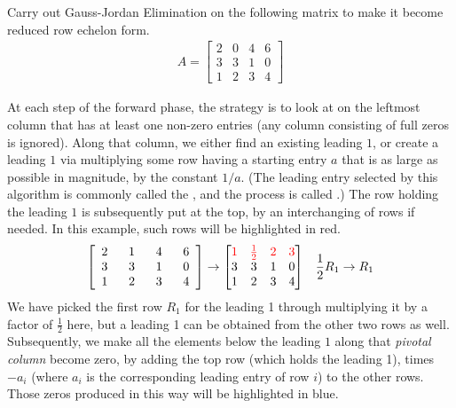 \begin{exmp}
Carry out Gauss-Jordan Elimination on the following matrix to make it become reduced row echelon form.
\begin{align*}
A =
\begin{bmatrix}
2 & 0 & 4 & 6 \\
3 & 3 & 1 & 0 \\
1 & 2 & 3 & 4
\end{bmatrix}    
\end{align*}
\end{exmp}
\begin{solution}
At each step of the forward phase, the strategy is to look at on the leftmost column that has at least one non-zero entries (any column consisting of full zeros is ignored). Along that column, we either find an existing leading $1$, or create a leading $1$ via multiplying some row having a starting entry $a$ that is as large as possible in magnitude, by the constant $1/a$. (The leading entry selected by this algorithm is commonly called the , and the process is called .) The row holding the leading $1$ is subsequently put at the top, by an interchanging of rows if needed. In this example, such rows will be highlighted in red.
\begin{align*}
\left[\begin{array}{@{\,}wc{12pt}wc{12pt}wc{12pt}wc{12pt}@{\,}}
2 & 1 & 4 & 6 \\
3 & 3 & 1 & 0 \\
1 & 2 & 3 & 4
\end{array}\right]
&\to
\begin{bmatrix}
\textcolor{red}{1} & \textcolor{red}{\frac{1}{2}} & \textcolor{red}{2} & \textcolor{red}{3} \\
3 & 3 & 1 & 0 \\
1 & 2 & 3 & 4
\end{bmatrix}
& \frac{1}{2}R_1 \to R_1
\end{align*}
We have picked the first row $R_1$ for the leading 1 through multiplying it by a factor of $\frac{1}{2}$ here, but a leading 1 can be obtained from the other two rows as well. Subsequently, we make all the elements below the leading $1$ along that \textit{pivotal column} become zero, by adding the top row (which holds the leading 1), times $-a_i$ (where $a_i$ is the corresponding leading entry of row $i$) to the other rows. Those zeros produced in this way will be highlighted in blue.
\begin{align*}

\end{align*}
\end{solution}
